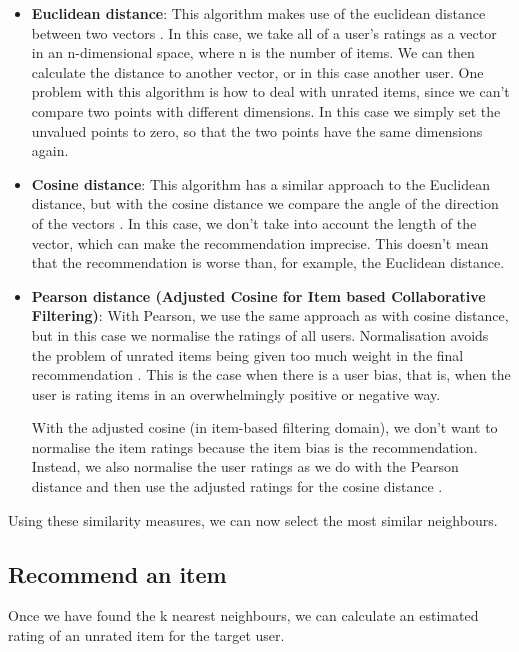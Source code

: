 \begin{itemize}
    \item  \textbf{Euclidean distance}: This algorithm makes use of the euclidean distance between two vectors \cite{miningOfMassiveDatasets}. In this case, we take all of a user's ratings as a vector in an n-dimensional space, where n is the number of items. We can then calculate the distance to another vector, or in this case another user. One problem with this algorithm is how to deal with unrated items, since we can't compare two points with different dimensions. In this case we simply set the unvalued points to zero, so that the two points have the same dimensions again.

    \item \textbf{Cosine distance}: This algorithm has a similar approach to the Euclidean distance, but with the cosine distance we compare the angle of the direction of the vectors \cite{miningOfMassiveDatasets}. In this case, we don't take into account the length of the vector, which can make the recommendation imprecise. This doesn't mean that the recommendation is worse than, for example, the Euclidean distance.

    \item \textbf{Pearson distance (Adjusted Cosine for Item based Collaborative Filtering)}: With Pearson, we use the same approach as with cosine distance, but in this case we normalise the ratings of all users. Normalisation avoids the problem of unrated items being given too much weight in the final recommendation \cite{miningOfMassiveDatasets}. This is the case when there is a user bias, that is, when the user is rating items in an overwhelmingly positive or negative way.

With the adjusted cosine (in item-based filtering domain), we don't want to normalise the item ratings because the item bias is the recommendation. Instead, we also normalise the user ratings as we do with the Pearson distance and then use the adjusted ratings for the cosine distance \cite{miningOfMassiveDatasets}.

\end{itemize}

Using these similarity measures, we can now select the most similar neighbours.

\subsection{Recommend an item}

Once we have found the k nearest neighbours, we can calculate an estimated rating of an unrated item for the target user. 

